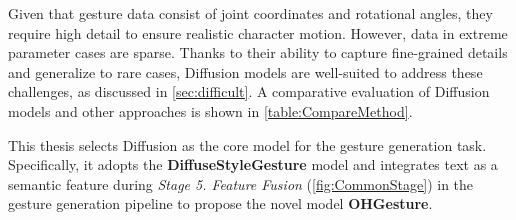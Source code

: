 Given that gesture data consist of joint coordinates and rotational angles, they require high detail to ensure realistic character motion. However, data in extreme parameter cases are sparse. Thanks to their ability to capture fine-grained details and generalize to rare cases, Diffusion models are well-suited to address these challenges, as discussed in \autoref{sec:difficult}. A comparative evaluation of Diffusion models and other approaches is shown in \autoref{table:CompareMethod}.

This thesis selects Diffusion as the core model for the gesture generation task. Specifically, it adopts the \textbf{DiffuseStyleGesture} \cite{yang2023diffusestylegesture} model and integrates text as a semantic feature during \textit{Stage 5. Feature Fusion} (\autoref{fig:CommonStage}) in the gesture generation pipeline to propose the novel model \textbf{OHGesture}.
